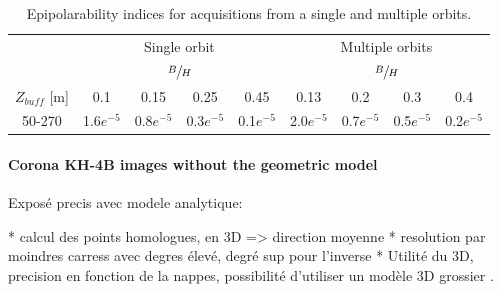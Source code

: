 \documentclass{ipol}
\begin{document}
\begin{table}[h!]

\begin{center}
\begin{tabular}{|c|c|c|c|c||c|c|c|c|}

\multicolumn{1}{c}{}  & \multicolumn{4}{c}{Single orbit} & \multicolumn{4}{c}{Multiple orbits}   \\
 \cline{2-9} 
 \multicolumn{1}{c}{}  & \multicolumn{4}{|c||}{ $\sfrac{B}{H}$ } & \multicolumn{4}{|c|}{$\sfrac{B}{H}$ }  \\
 \multicolumn{1}{c|}{$Z_{buff}$ [m]}  &  0.1 &  0.15   & 0.25  &  0.45 &  0.13 &  0.2   & 0.3  &  0.4   \\
 \cline{1-9}
  
 50-270  &   1.6$e^{-5}$    &  0.8$e^{-5}$  &  0.3$e^{-5}$  &  0.1$e^{-5}$   &   2.0$e^{-5}$  &     0.7$e^{-5}$  &  0.5$e^{-5}$   &    0.2$e^{-5}$   \\
\hline 

\end{tabular}
\end{center}
\caption{Epipolarability indices for acquisitions from a single and {multiple orbits}.}\label{tab:PHR1indices}
\end{table}


 


 
\paragraph{Corona KH-4B images without the geometric model}
Exposé precis avec modele analytique:

    * calcul des points homologues, en 3D => direction moyenne
    * resolution par moindres carress avec degres élevé, degré sup pour l'inverse
    * Utilité du 3D, precision en fonction de la nappes, possibilité d'utiliser un modèle 3D grossier .
\end{document}
